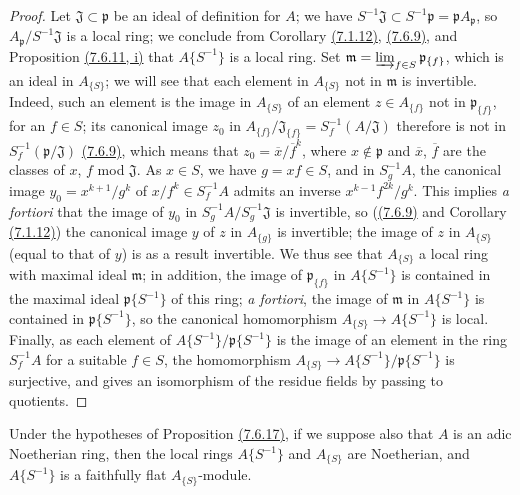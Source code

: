 \begin{proof}
\label{proof-prop-0.7.6.17}
Let $\mathfrak{J}\subset\mathfrak{p}$ be an ideal of definition for $A$; we have
$S^{-1}\mathfrak{J}\subset S^{-1}\mathfrak{p}=\mathfrak{p}A_\mathfrak{p}$, so
$A_\mathfrak{p}/S^{-1}\mathfrak{J}$ is a local ring; we conclude from 
Corollary \hyperref[cor-0.7.1.12]{(7.1.12)}, \hyperref[env-0.7.6.9]{(7.6.9)}, and
Proposition \hyperref[prop-0.7.6.11]{(7.6.11, i)} that $A\{S^{-1}\}$ is a local ring. Set
$\mathfrak{m}=\varinjlim_{f\in S}\mathfrak{p}_{\{f\}}$, which is an ideal in $A_{\{S\}}$; we
will see that each element in $A_{\{S\}}$ not in $\mathfrak{m}$ is invertible. Indeed, such an
element is the image in $A_{\{S\}}$ of an element $z\in A_{\{f\}}$ not in $\mathfrak{p}_{\{f\}}$,
for an $f\in S$; its canonical image $z_0$ in
$A_{\{f\}}/\mathfrak{J}_{\{f\}}=S_f^{-1}(A/\mathfrak{J})$ therefore is not in
$S_f^{-1}(\mathfrak{p}/\mathfrak{J})$ \hyperref[env-0.7.6.9]{(7.6.9)}, which means that
$z_0=\overline{x}/\overline{f}^k$, where $x\not\in\mathfrak{p}$ and $\overline{x}$, $\overline{f}$
are the classes of $x$, $f$ mod $\mathfrak{J}$. As $x\in S$, we have $g=xf\in S$, and in
$S_g^{-1}A$, the canonical image $y_0=x^{k+1}/g^k$ of $x/f^k\in S_f^{-1}A$ admits an inverse
$x^{k-1}f^{2k}/g^k$. This implies {\em a fortiori} that the image of $y_0$ in
$S_g^{-1}A/S_g^{-1}\mathfrak{J}$ is invertible, so (\hyperref[env-0.7.6.9]{(7.6.9)} and
Corollary \hyperref[cor-0.7.1.12]{(7.1.12)}) the canonical image $y$ of $z$ in $A_{\{g\}}$ is
invertible; the image of $z$ in $A_{\{S\}}$ (equal to that of $y$) is as a result invertible.
We thus see that $A_{\{S\}}$ a local ring with maximal ideal $\mathfrak{m}$; in addition, the image
of $\mathfrak{p}_{\{f\}}$ in $A\{S^{-1}\}$ is contained in the maximal ideal $\mathfrak{p}\{S^{-1}\}$
of this ring; {\em a fortiori}, the image of $\mathfrak{m}$ in $A\{S^{-1}\}$ is contained in
$\mathfrak{p}\{S^{-1}\}$, so the canonical homomorphism $A_{\{S\}}\to A\{S^{-1}\}$ is local. Finally,
as each element of $A\{S^{-1}\}/\mathfrak{p}\{S^{-1}\}$ is the image of an element in the ring
$S_f^{-1}A$ for a suitable $f\in S$, the homomorphism $A_{\{S\}}\to A\{S^{-1}\}/\mathfrak{p}\{S^{-1}\}$
is surjective, and gives an isomorphism of the residue fields by passing to quotients.
\end{proof}

\begin{cor}[7.6.18]
\label{cor-0.7.6.18}
Under the hypotheses of Proposition \hyperref[prop-0.7.6.17]{(7.6.17)}, if we suppose also that
$A$ is an adic Noetherian ring, then the local rings $A\{S^{-1}\}$ and $A_{\{S\}}$ are Noetherian,
and $A\{S^{-1}\}$ is a faithfully flat $A_{\{S\}}$-module.
\end{cor}

